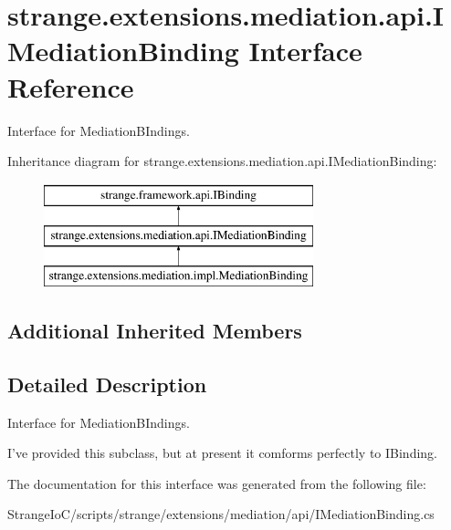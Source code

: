 \hypertarget{interfacestrange_1_1extensions_1_1mediation_1_1api_1_1_i_mediation_binding}{\section{strange.\-extensions.\-mediation.\-api.\-I\-Mediation\-Binding Interface Reference}
\label{interfacestrange_1_1extensions_1_1mediation_1_1api_1_1_i_mediation_binding}
}


Interface for Mediation\-B\-Indings.  


Inheritance diagram for strange.\-extensions.\-mediation.\-api.\-I\-Mediation\-Binding\-:\begin{figure}[H]
\begin{center}
\leavevmode
\includegraphics[height=3.000000cm]{interfacestrange_1_1extensions_1_1mediation_1_1api_1_1_i_mediation_binding}
\end{center}
\end{figure}
\subsection*{Additional Inherited Members}


\subsection{Detailed Description}
Interface for Mediation\-B\-Indings. 

I've provided this subclass, but at present it comforms perfectly to I\-Binding. 

The documentation for this interface was generated from the following file\-:\begin{DoxyCompactItemize}
\item 
Strange\-Io\-C/scripts/strange/extensions/mediation/api/I\-Mediation\-Binding.\-cs\end{DoxyCompactItemize}

